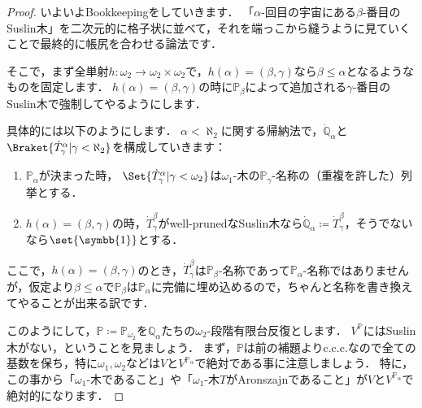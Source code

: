 \documentclass[a4j]{ltjsarticle}
\newcommand{\mathds}[1]{\symbb{#1}}
\renewcommand{\defeq}{\mathrel{\coloneq}}
\begin{document}
\begin{proof}
 いよいよBookkeepingをしていきます．
 「$\alpha$-回目の宇宙にある$\beta$-番目のSuslin木」を二次元的に格子状に並べて，それを端っこから縫うように見ていくことで最終的に帳尻を合わせる論法です．

 そこで，まず全単射$h: \omega_2 \to \omega_2 \times \omega_2$で，$h(\alpha) = (\beta, \gamma)$なら$\beta \leq \alpha$となるようなものを固定します．
 $h(\alpha) = (\beta, \gamma)$の時に$\mathbb{P}_\beta$によって追加される$\gamma$-番目のSuslin木で強制してやるようにします．
 
 具体的には以下のようにします．
 $\alpha < \aleph_2$に関する帰納法で，$\dot{\mathbb{Q}}_\alpha$と$\Braket{\dot{T}^\alpha_\gamma | \gamma < \aleph_2}$を構成していきます：
 \begin{enumerate}
  \item $\mathbb{P}_\alpha$が決まった時，
        $\Set{\dot{T}^\alpha_\gamma | \gamma < \omega_2}$は$\omega_1$-木の$\mathbb{P}_\gamma$-名称の（重複を許した）列挙とする．
  \item $h(\alpha) = (\beta, \gamma)$の時，$\dot{T}^\beta_\gamma$がwell-prunedなSuslin木なら$\dot{\mathbb{Q}}_\alpha \defeq \dot{T}^\beta_\gamma$，そうでないなら$\set{\mathds{1}}$とする．
 \end{enumerate}
 ここで，$h(\alpha) = (\beta, \gamma)$のとき，$\dot{T}^\beta_\gamma$は$\mathbb{P}_\beta$-名称であって$\mathbb{P}_\alpha$-名称ではありませんが，仮定より$\beta \leq \alpha$で$\mathbb{P}_\beta$は$\mathbb{P}_\alpha$に完備に埋め込めるので，ちゃんと名称を書き換えてやることが出来る訳です．

 このようにして，$\mathbb{P} \defeq \mathbb{P}_{\omega_2}$を$\mathbb{Q}_\alpha$たちの$\omega_2$-段階有限台反復とします．
 $V^{\mathbb{P}}$にはSuslin木がない，ということを見ましょう．
 まず，$\mathbb{P}$は前の補題よりc.c.c.なので全ての基数を保ち，特に$\omega_1, \omega_2$などは$V$と$V^{\mathbb{P}_\alpha}$で絶対である事に注意しましょう．
 特に，この事から「$\omega_1$-木であること」や「$\omega_1$-木$T$がAronszajnであること」が$V$と$V^{\mathbb{P}_\alpha}$で絶対的になります．


\end{proof}
\end{document}
